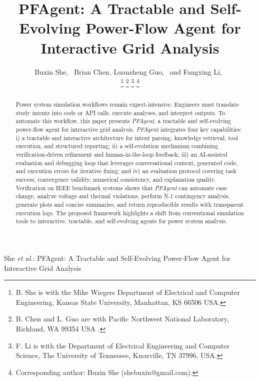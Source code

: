 \documentclass[journal]{IEEEtran}
\begin{document}
\title{PFAgent: A Tractable and Self-Evolving Power-Flow Agent for Interactive Grid Analysis}

\author{Buxin She,~
Brian Chen,
Luanzheng Guo,~
and Fangxing Li,~

\thanks{B. She is with the Mike Wiegers Department of Electrical and
Computer Engineering, Kansas State University, Manhattan, KS 66506 USA.}
\thanks{B. Chen and L. Guo are with Pacific Northwest National Laboratory, Richland, WA 99354 USA .}
\thanks{F. Li is with the Department of Electrical Engineering and Computer Science,
The University of Tennessee, Knoxville, TN 37996, USA.}
\thanks{Corresponding author: Buxin She (shebuxin@gmail.com).}
        } %

%
{She \MakeLowercase{\textit{et al.}}: PFAgent: A Tractable and Self-Evolving Power-Flow Agent for Interactive Grid Analysis}

\maketitle

\begin{abstract}
Power system simulation workflows remain expert-intensive. Engineers must translate study intents into code or API calls, execute analyses, and interpret outputs. 
To automate this workflow, this paper presents \textit{PFAgent}, a tractable and self-evolving power-flow agent for interactive grid analysis.
\textit{PFAgent} integrates four key capabilities:
i) a tractable and interactive architecture for intent parsing, knowledge retrieval, tool execution, and structured reporting;
ii) a self-evolution mechanism combining verification-driven refinement and human-in-the-loop feedback;
iii) an AI-assisted evaluation and debugging loop that leverages conversational context, generated code, and execution errors for iterative fixing;
and iv) an evaluation protocol covering task success, convergence validity, numerical consistency, and explanation quality.
Verification on IEEE benchmark systems shows that \textit{PFAgent} can automate case change, analyze voltage and thermal violations, perform N-1 contingency analysis, generate plots and concise summaries, and return reproducible results with transparent execution logs.
The proposed framework highlights a shift from conventional simulation tools to interactive, tractable, and self-evolving agents for power system analysis.
\end{abstract}
\end{document}

